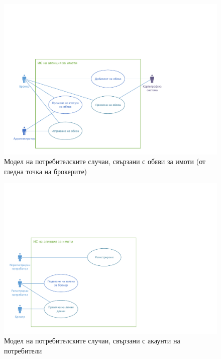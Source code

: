 \documentclass[a4paper]{article}
\begin{document}
        \begin{figure}[h]
        \centering
        \includegraphics[scale=1]{uc2b}
        \caption{Модел на потребителските случаи, свързани с обяви за имоти (от гледна точка на брокерите)}
        \end{figure}

\clearpage

        \begin{figure}[h]
        \centering
        \includegraphics[scale=1]{uc2c}
        \caption{Модел на потребителските случаи, свързани с акаунти на потребители}
        \end{figure}

\clearpage
\end{document}
